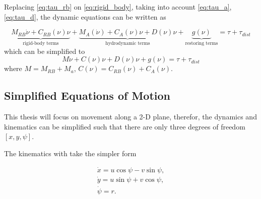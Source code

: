 \par Replacing \eqref{eq:tau_rb} on \eqref{eq:rigid_body}, taking into account \eqref{eq:tau_a}, \eqref{eq:tau_d}, the dynamic equations can
be written as

\begin{equation}
    \underbrace{M_{RB}\dot{\nu} + C_{RB}(\nu)\nu}_{\text{rigid-body terms}} + \underbrace{M_A(\dot{\nu}) + C_A(\nu)\nu + D(\nu)\nu}_{\text{hydrodynamic terms}} + \underbrace{g(\nu)}_{\text{restoring terms}} = \tau + \tau_{dist}
\end{equation}
which can be simplified to
\begin{equation}
    M\dot{\nu} + C(\nu)\nu + D(\nu)\nu + g(\nu) = \tau + \tau_{dist}
\end{equation}
where $M = M_{RB} + M_a$, $C(\nu) = C_{RB}(\nu) + C_A(\nu)$.

\subsection{Simplified Equations of Motion}

\par This thesis will focus on movement along a 2-D plane, therefor, the dynamics and kinematics can be simplified such that there are only three degrees of freedom $[x,y,\psi]$.
\par The kinematics with take the simpler form 

\begin{equation}
    \begin{gathered}
        \dot{x} = u \cos \psi - v \sin \psi, \\
        \dot{y} = u \sin \psi + v \cos \psi, \\
        \dot{\psi} = r.
    \end{gathered}
\end{equation}

